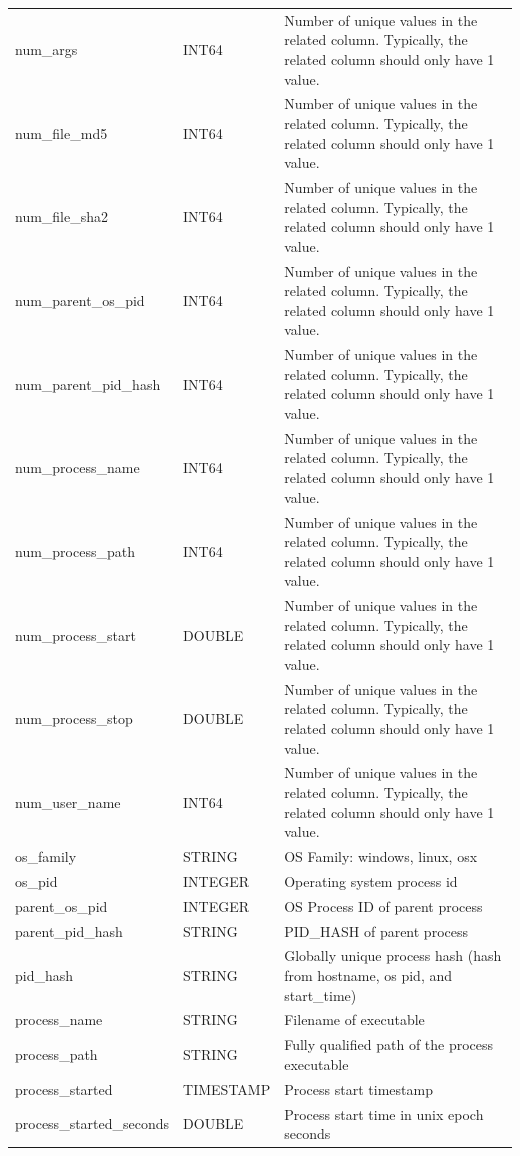 \documentclass[conference,compsoc]{IEEEtran}
\begin{document}
\begin{longtable}{|p{5cm}|p{2cm}|p{9cm}|}
num\_args & INT64 & Number of unique values in the related column. Typically, the related column should only have 1 value. \\
num\_file\_md5 & INT64 & Number of unique values in the related column. Typically, the related column should only have 1 value. \\
num\_file\_sha2 & INT64 & Number of unique values in the related column. Typically, the related column should only have 1 value. \\
num\_parent\_os\_pid & INT64 & Number of unique values in the related column. Typically, the related column should only have 1 value. \\
num\_parent\_pid\_hash & INT64 & Number of unique values in the related column. Typically, the related column should only have 1 value. \\
num\_process\_name & INT64 & Number of unique values in the related column. Typically, the related column should only have 1 value. \\
num\_process\_path & INT64 & Number of unique values in the related column. Typically, the related column should only have 1 value. \\
num\_process\_start & DOUBLE & Number of unique values in the related column. Typically, the related column should only have 1 value. \\
num\_process\_stop & DOUBLE & Number of unique values in the related column. Typically, the related column should only have 1 value. \\
num\_user\_name & INT64 & Number of unique values in the related column. Typically, the related column should only have 1 value. \\
os\_family & STRING & OS Family: windows, linux, osx \\
os\_pid & INTEGER & Operating system process id \\
parent\_os\_pid & INTEGER & OS Process ID of parent process \\
parent\_pid\_hash & STRING & PID\_HASH of parent process \\
pid\_hash & STRING & Globally unique process hash (hash from hostname, os pid, and start\_time) \\
process\_name & STRING & Filename of executable \\
process\_path & STRING & Fully qualified path of the process executable \\
process\_started & TIMESTAMP & Process start timestamp \\
process\_started\_seconds & DOUBLE & Process start time in unix epoch seconds \\

\end{longtable}
\end{document}
